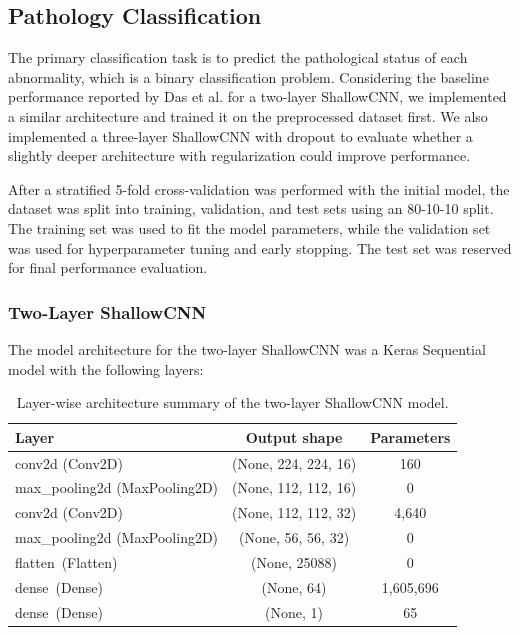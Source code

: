 \documentclass[12pt]{article}
\begin{document}
\subsection{Pathology Classification}
The primary classification task is to predict the pathological status of each abnormality, which is a binary classification problem. Considering the baseline performance reported by Das et al. \cite{ref:example2} for a two-layer ShallowCNN, we implemented a similar architecture and trained it on the preprocessed dataset first. We also implemented a three-layer ShallowCNN with dropout to evaluate whether a slightly deeper architecture with regularization could improve performance.

\medskip \noindent
After a stratified 5-fold cross-validation was performed with the initial model, the dataset was split into training, validation, and test sets using an 80-10-10 split. The training set was used to fit the model parameters, while the validation set was used for hyperparameter tuning and early stopping. The test set was reserved for final performance evaluation. 

\subsubsection{Two-Layer ShallowCNN}

The model architecture for the two-layer ShallowCNN was a Keras Sequential model with the following layers:

\begin{table}[!htbp]
    \centering
    \begin{tabular}{lcc}
        \toprule
        Layer & Output shape & Parameters \\
        \midrule
        conv2d (Conv2D) & (None, 224, 224, 16) & 160 \\
        max\_pooling2d (MaxPooling2D) & (None, 112, 112, 16) & 0 \\
        conv2d (Conv2D) & (None, 112, 112, 32) & 4,640 \\
        max\_pooling2d (MaxPooling2D) & (None, 56, 56, 32) & 0 \\
        flatten\ (Flatten) & (None, 25088) & 0 \\
        dense\ (Dense) & (None, 64) & 1,605,696 \\
        dense\ (Dense) & (None, 1) & 65 \\
        \bottomrule
    \end{tabular}
    \caption{Layer-wise architecture summary of the two-layer ShallowCNN model.}
    \label{tab:twolayercnn}
\end{table}
\end{document}
